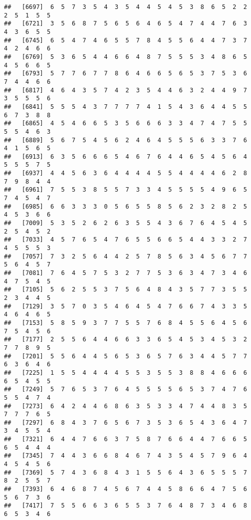 \documentclass[
]{book}
\begin{document}
\begin{verbatim}
##   [6697]  6  5  7  3  5  4  3  5  4  4  5  4  5  3  8  6  5  2  2  2  5  1  5  5
##   [6721]  3  5  6  8  7  5  6  5  6  4  6  5  4  7  4  4  7  6  3  4  3  6  5  5
##   [6745]  6  5  4  7  4  6  5  5  7  8  4  5  5  6  4  4  7  3  7  4  2  4  6  6
##   [6769]  5  3  6  5  4  4  6  6  4  8  7  5  5  5  3  4  8  6  5  4  5  6  6  5
##   [6793]  5  7  7  6  7  7  8  6  4  6  6  5  6  5  3  7  5  3  6  7  4  4  6  6
##   [6817]  4  6  4  3  5  7  4  2  3  5  4  4  6  3  2  4  4  9  7  3  5  5  5  6
##   [6841]  5  5  5  4  3  7  7  7  7  4  1  5  4  3  6  4  4  5  5  6  7  3  8  8
##   [6865]  4  5  4  6  6  5  3  5  6  6  6  3  3  4  7  4  7  5  5  5  5  4  6  3
##   [6889]  5  6  7  5  4  5  6  2  4  6  4  5  5  5  6  3  3  7  6  4  1  5  6  5
##   [6913]  6  3  5  6  6  6  5  4  6  7  6  4  4  6  5  4  5  6  4  5  5  5  7  5
##   [6937]  4  4  5  6  3  6  4  4  4  4  5  5  4  4  4  4  6  2  8  7  9  8  4  4
##   [6961]  7  5  5  3  8  5  5  7  3  3  4  5  5  5  5  4  9  6  5  7  4  5  4  7
##   [6985]  6  6  3  3  3  0  5  6  5  5  8  5  6  2  3  2  8  2  5  4  5  3  6  6
##   [7009]  5  3  5  2  6  2  6  3  5  5  4  3  6  7  6  4  5  4  5  2  5  4  5  2
##   [7033]  4  5  7  6  5  4  7  6  5  5  6  6  5  4  4  3  3  2  7  4  5  5  5  3
##   [7057]  7  3  2  5  6  4  4  2  5  7  8  5  6  3  4  5  6  7  7  5  6  4  5  7
##   [7081]  7  6  4  5  7  5  3  2  7  7  5  3  6  3  4  7  3  4  6  4  7  5  4  5
##   [7105]  5  6  2  5  5  3  7  5  6  4  8  4  3  5  7  7  3  5  5  2  3  4  4  5
##   [7129]  3  5  7  0  3  5  4  6  4  5  4  7  6  6  7  4  3  3  5  4  6  4  6  5
##   [7153]  5  8  5  9  3  7  7  5  5  7  6  8  4  5  5  6  4  5  6  7  5  4  5  6
##   [7177]  2  5  5  6  4  4  6  6  3  3  6  5  4  5  3  4  5  3  2  7  7  8  9  5
##   [7201]  5  5  6  4  4  5  6  5  3  6  5  7  6  3  4  4  5  7  7  6  3  6  4  6
##   [7225]  1  5  5  4  4  4  4  5  5  3  5  5  3  8  8  4  6  6  6  6  5  4  5  5
##   [7249]  5  7  6  5  3  7  6  4  5  5  5  5  6  5  3  7  4  7  6  5  5  4  7  4
##   [7273]  6  4  2  4  4  6  8  6  3  5  3  3  4  7  4  4  8  3  5  7  7  7  6  5
##   [7297]  6  8  4  3  7  6  5  6  7  3  5  3  6  5  4  3  6  4  7  3  4  5  5  4
##   [7321]  6  4  4  7  6  6  3  7  5  8  7  6  6  4  4  7  6  6  5  6  5  4  4  4
##   [7345]  7  4  4  3  6  6  8  4  6  7  4  3  5  4  5  7  9  6  4  4  5  4  5  6
##   [7369]  5  7  4  3  6  8  4  3  1  5  5  6  4  3  6  5  5  5  7  8  2  5  5  7
##   [7393]  6  4  6  8  7  4  5  6  7  4  4  5  8  6  6  4  7  5  6  5  6  7  3  6
##   [7417]  7  5  5  6  6  3  6  5  5  3  7  6  4  8  7  3  4  6  8  6  5  3  4  6

\end{verbatim}
\end{document}
